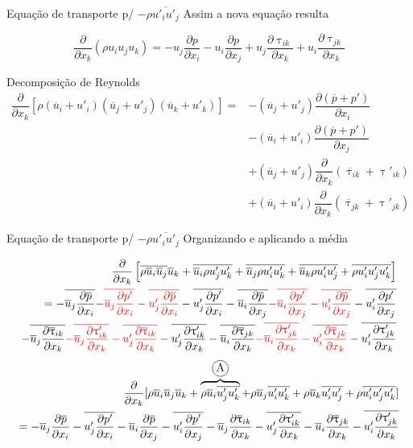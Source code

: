 \documentclass[10pt]{beamer}
\newcommand{\ddx}[2]{\dfrac{\partial #1}{\partial x_{#2}}}
\newcommand{\ddxp}[2]{\dfrac{\partial }{\partial x_{#2}}\left(#1\right)}
\newcommand{\m}[1]{\overline{#1}}
\newcommand{\red}[1]{{\color{red}#1}}
\newcommand{\incircle}[1]{{\tikz[baseline=(X.base)] \node(X)[draw, shape=circle, inner sep=0]{\strut #1};}}
\begin{document}
\begin{frame}{Equação de transporte p/ $ -\rho \m{u'_i u'_j} $}
	Assim a nova equação resulta
	
	\begin{equation*}
	\ddxp{\rho u_i u_j u_k}{k} = - u_j \ddx{p}{i} - u_i \ddx{p}{j} + u_j \ddx{\uptau_{ik}}{k} + u_i \ddx{\uptau_{jk}}{k}
	\end{equation*}
	
	Decomposição de Reynolds
	\begin{align*}
	\ddx{ }{k}\left[ \rho (\m{u}_i + u'_i) (\m{u}_j + u'_j) (\m{u}_k + u'_k) \right] = 
	&- (\m{u}_j + u'_j)\ddx{(\m{p} + p')}{i} \\ 
	&- (\m{u}_i + u'_i)\ddx{(\m{p} + p')}{j} \\
	&+ (\m{u}_j + u'_j) \ddxp{\m{\uptau}_{ik} + \uptau'_{ik}}{k} \\ 
	&+ (\m{u}_i + u'_i) \ddxp{\m{\uptau}_{jk} + \uptau'_{jk}}{k}
	\end{align*}
	
\end{frame}

\begin{frame}{Equação de transporte p/ $ -\rho \m{u'_i u'_j} $}
	Organizando e aplicando a média
	
	\begin{align*}
	\ddx{ }{k}\left[ \m{\rho \m{u}_i \m{u}_j} \m{u}_k + \m{\m{u}_i \rho u'_j u'_k} + \m{\m{u}_j \rho u'_i u'_k} + \m{\m{u}_k \rho u'_i u'_j} + \m{\rho u'_i u'_j u'_k} \right] \\
	=
	- \m{\m{u}_j \ddx{\m{p}}{i}} \red{- \m{\m{u}_j \ddx{p'}{i}} - \m{u'_j \ddx{\m{p}}{i}}} - \m{u'_j \ddx{p'}{i}}
	- \m{\m{u}_i \ddx{\m{p}}{j}} \red{- \m{\m{u}_i \ddx{p'}{j}} - \m{u'_i \ddx{\m{p}}{j}}} - \m{u'_i \ddx{p'}{j}} \\
	- \m{\m{u}_j \ddx{\m{\uptau}_{ik}}{k}} \red{- \m{\m{u}_j \ddx{\uptau'_{ik}}{k}} - \m{u'_j \ddx{\m{\uptau}_{ik}}{k}}} - \m{u'_j \ddx{\uptau'_{ik}}{k}}
	- \m{\m{u}_i \ddx{\m{\uptau}_{jk}}{k}} \red{- \m{\m{u}_i \ddx{\uptau'_{jk}}{k}} - \m{u'_i \ddx{\m{\uptau}_{jk}}{k}}} - \m{u'_i \ddx{\uptau'_{jk}}{k}}
	\end{align*}
	\begin{align}\label{eq:RSMinst}
	\ddx{ }{k}[ \rho \m{u}_i \m{u}_j \m{u}_k + \overbrace{\rho \m{u}_i \m{u'_j u'_k}}^{\incircle{A}} + \rho \m{u}_j \m{u'_i u'_k} + \rho \m{u}_k \m{u'_i u'_j} + \rho \m{u'_i u'_j u'_k} ] \nonumber \\
	=
	- \m{u}_j \ddx{\m{p}}{i} - \m{u'_j \ddx{p'}{i}}
	- \m{u}_i \ddx{\m{p}}{j} - \m{u'_i \ddx{p'}{j}}
	- \m{u}_j \ddx{\m{\uptau}_{ik}}{k} - \m{u'_j \ddx{\uptau'_{ik}}{k}}
	- \m{u}_i \ddx{\m{\uptau}_{jk}}{k} - \m{u'_i \ddx{\uptau'_{jk}}{k}}
	\end{align}
\end{frame}
\end{document}
